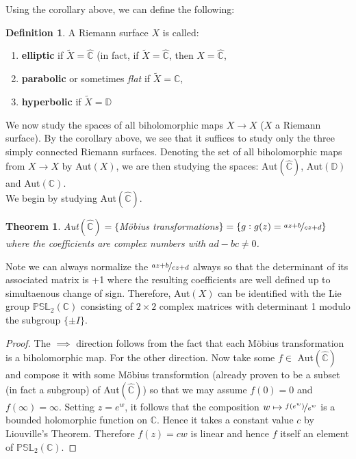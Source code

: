 \documentclass[a4paper, 11pt]{book}
\newtheorem{theorem}{Theorem}
\theoremstyle{definition}
\newtheorem{definition}{Definition}[section]
\theoremstyle{remark}
\begin{document}
    Using the corollary above, we can define the following:

    \begin{definition}
        A Riemann surface $X$ is called:
        \begin{enumerate}
            \item \textbf{elliptic} if $\widetilde{X} = \hat{\mathbb{C}}$ (in fact, if $\widetilde{X} = \hat{\mathbb{C}}$, then
                $X = \hat{\mathbb{C}}$,
            \item \textbf{parabolic} or sometimes \textit{flat} if $\widetilde{X} = \mathbb{C}$,
            \item \textbf{hyperbolic} if $\widetilde{X} = \mathbb{D}$
        \end{enumerate}
    \end{definition}

    We now study the spaces of all biholomorphic maps $X\to X$ ($X$ a Riemann surface). By the corollary above, we see that it
    suffices to study only the three simply connected Riemann surfaces. Denoting the set of all biholomorphic maps from $X\to X$ by
    Aut$(X)$, we are then studying the spaces: Aut$(\hat{\mathbb{C}})$, Aut$(\mathbb{D})$ and Aut$(\mathbb{C})$.\\

    We begin by studying Aut$(\hat{\mathbb{C}})$.

    \begin{theorem}
        Aut$(\hat{\mathbb{C}}) = \{$Möbius transformations$\} = \{g: g(z) = \nicefrac{az+b}{cz+d}\}$ where the coefficients are
        complex numbers with $ad-bc\neq 0$.
    \end{theorem}

    Note we can always normalize the $\nicefrac{az+b}{cz+d}$ always so that the determinant of its associated matrix
    is +1 where the resulting coefficients are well defined up to simultaenous change of sign. Therefore, Aut$(X)$ can
    be identified with the Lie group $\mathbb{PSL}_2(\mathbb{C})$ consisting of $2 \times 2$ complex matrices with determinant
    1 modulo the subgroup $\{\pm I\}$.

    \begin{proof}
        The $\implies$ direction follows from the fact that each Möbius transformation is a biholomorphic map. For the other
        direction. Now take some $f\in$ Aut$(\hat{\mathbb{C}})$ and compose it with some Möbius transformtion (already proven
        to be a subset (in fact a subgroup) of Aut$(\hat{\mathbb{C}})$) so that we may assume $f(0) = 0$ and $f(\infty) = \infty$.
        Setting $z=e^w$, it follows that the composition $w\mapsto \nicefrac{f(e^w)}{e^w}$ is a bounded holomorphic function on
        $\mathbb{C}$. Hence it takes a constant value $c$ by Liouville's Theorem. Therefore $f(z)=cw$ is linear and hence $f$
        itself an element of $\mathbb{PSL}_2(\mathbb{C})$.
    \end{proof}
\end{document}
